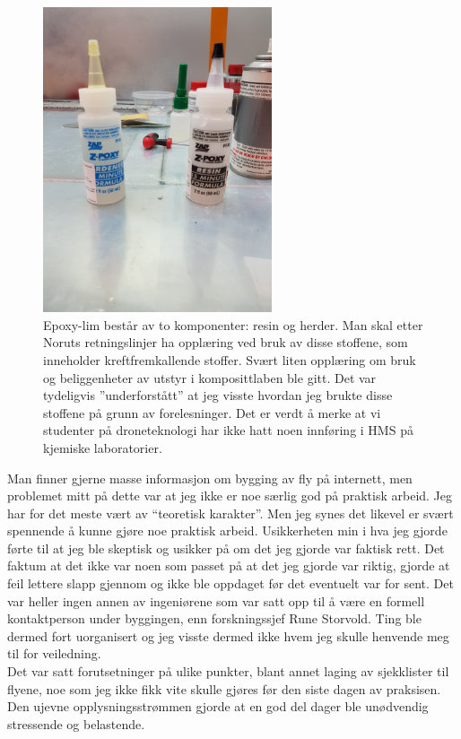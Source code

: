 \documentclass[12pt, a4paper]{article}
\begin{document}
\begin{figure}[h]
	\centering
	\includegraphics[width = .6\textwidth, height=9cm]{bilder/epoxyresin.jpg}
	\caption[Epoxy og herder]{Epoxy-lim består av to komponenter: resin og herder. Man skal etter Noruts retningslinjer ha opplæring ved bruk av disse stoffene, som inneholder kreftfremkallende stoffer. Svært liten opplæring om bruk og beliggenheter av utstyr i komposittlaben ble gitt. Det var tydeligvis ''underforstått'' at jeg visste hvordan jeg brukte disse stoffene på grunn av forelesninger. Det er verdt å merke at vi studenter på droneteknologi har ikke hatt noen innføring i HMS på kjemiske laboratorier.}

\end{figure}

\newpage
Man finner gjerne masse informasjon om bygging av fly på internett, men problemet mitt på dette var at jeg ikke er noe særlig god på praktisk arbeid. Jeg har for det meste vært av ``teoretisk karakter''. Men jeg synes det likevel er svært spennende å kunne gjøre noe praktisk arbeid. Usikkerheten min i hva jeg gjorde førte til at jeg ble skeptisk og usikker på om det jeg gjorde var faktisk rett. Det faktum at det ikke var noen som passet på at det jeg gjorde var riktig, gjorde at feil lettere slapp gjennom og ikke ble oppdaget før det eventuelt var for sent. Det var heller ingen annen av ingeniørene som var satt opp til å være en formell kontaktperson under byggingen, enn forskningssjef Rune Storvold. Ting ble dermed fort uorganisert og jeg visste dermed ikke hvem jeg skulle henvende meg til for veiledning. \\

Det var satt forutsetninger på ulike punkter, blant annet laging av sjekklister til flyene, noe som jeg ikke fikk vite skulle gjøres før den siste dagen av praksisen. Den ujevne opplysningsstrømmen gjorde at en god del dager ble unødvendig stressende og belastende. 
\end{document}
